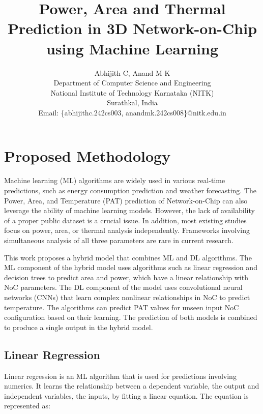 \documentclass[conference]{IEEEtran}
\begin{document}
\title{Power, Area and Thermal Prediction in 3D Network-on-Chip using Machine Learning}

\author{Abhijith C, Anand M K \\

Department of Computer Science and Engineering \\ 
	National Institute of Technology Karnataka (NITK) \\ 
	Surathkal, India\\
Email: \{abhijithc.242cs003, anandmk.242cs008\}@nitk.edu.in}


\maketitle

\section{Proposed Methodology}

Machine learning (ML) algorithms are widely used in various real-time predictions, such as energy consumption prediction and weather forecasting. The Power, Area, and Temperature (PAT) prediction of Network-on-Chip can also leverage the ability of machine learning models. However, the lack of availability of a proper public dataset is a crucial issue. In addition, most existing studies focus on power, area, or thermal analysis independently. Frameworks involving simultaneous analysis of all three parameters are rare in current research.

This work proposes a hybrid model that combines ML and DL algorithms. The ML component of the hybrid model uses algorithms such as linear regression and decision trees to predict area and power, which have a linear relationship with NoC parameters. The DL component of the model uses convolutional neural networks (CNNs) that learn complex nonlinear relationships in NoC to predict temperature. The algorithms can predict PAT values for unseen input NoC configuration based on their learning. The prediction of both models is combined to produce a single output in the hybrid model.

\subsection{Linear Regression}

Linear regression is an ML algorithm that is used for predictions involving numerics. It learns the relationship between a dependent variable, the output and independent variables, the inputs, by fitting a linear equation. The equation is represented as:
\end{document}

